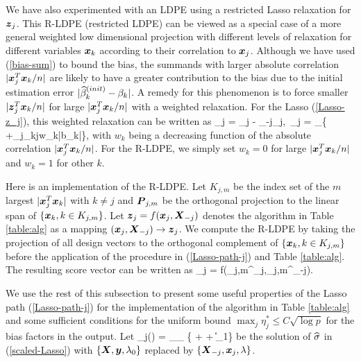 \documentclass[11pt]{amsart}
\def\argmin{\mathop{\rm arg\, min}}
\begin{document}
We have also experimented with an LDPE using a restricted Lasso relaxation for $\boldsymbol{z}_j$. 
This R-LDPE (restricted LDPE) can be viewed as a special case of a more general 
weighted low dimensional projection with different levels of relaxation for 
different variables $\boldsymbol{x}_k$ according to their correlation to $\boldsymbol{x}_j$. 
Although we have used (\ref{bias-sum}) to bound the bias, 
the summands with larger absolute correlation $|\boldsymbol{x}_j^T\boldsymbol{x}_k/n|$ are likely to have a 
greater contribution to the bias due to {the} initial estimation error $|\widehat{\beta}^{(init)}_k-\beta_k|$. 
A remedy for this phenomenon is to force smaller $|\boldsymbol{z}_j^T\boldsymbol{x}_k/n|$ for large 
$|\boldsymbol{x}_j^T\boldsymbol{x}_k/n|$ with a weighted relaxation. 
For the Lasso (\ref{Lasso-z_j}), this weighted relaxation can be written as 
\bes
\bz_j = \bx_j - \bX_{-j}\hbgamma_j,\ 
\hbgamma_j = \argmin_{\bb}\Big\{
+\lam_j\sum_{k\neq j}w_k|b_k|\Big\},
\ees
with $w_k$ being a decreasing function of the absolute correlation $|\boldsymbol{x}_j^T\boldsymbol{x}_k/n|$. 
For the {R-LDPE}, we simply set $w_k=0$ for large $|\boldsymbol{x}_j^T\boldsymbol{x}_k/n|$ and $w_k=1$ for other $k$. 

Here is an implementation of the {R-LDPE}. 
Let $K_{j,m}$ be the index set of the $m$ largest $|\boldsymbol{x}_j^T\boldsymbol{x}_k|$ with $k\neq j$ 
and $\boldsymbol{P}_{j,m}$ be the orthogonal projection to the linear span of $\{\boldsymbol{x}_k, k\in K_{j,m}\}$. 
Let $\boldsymbol{z}_j = f(\boldsymbol{x}_j,\boldsymbol{X}_{-j})$ denotes the algorithm in Table \ref{table:alg} as a mapping 
$(\boldsymbol{x}_j,\boldsymbol{X}_{-j})\to \boldsymbol{z}_j$.  We compute the {R-LDPE} by taking the projection of all 
design vectors to the orthogonal complement of $\{\boldsymbol{x}_k, k\in K_{j,m}\}$ before the 
application of the procedure in (\ref{Lasso-path-j}) and Table \ref{table:alg}. 
The resulting score vector can be written as 
\bz_j = f(\bP_{j,m}^\perp\bx_j,\bP_{j,m}^\perp\bX_{-j}). 
\eel

We use the rest of this subsection to present some useful properties of the Lasso path (\ref{Lasso-path-j}) 
for the implementation of the algorithm in Table \ref{table:alg} and some sufficient conditions 
for the uniform bound $\max_j\eta^*_j\le C\sqrt{\log p}$ for the bias factors in the output. 
Let 
\hsigma_j(\lam) = \argmin_{\sigma}\min_{\bb}
\Big\{ +  + \lam\|\bb\|_1\Big\}
\eel
be the solution of $\widehat{\sigma}$ in (\ref{scaled-Lasso}) 
with $\{\boldsymbol{X},\boldsymbol{y},\lambda_0\}$ replaced by $\{\boldsymbol{X}_{-j},\boldsymbol{x}_j,\lambda\}$. 
\end{document}

